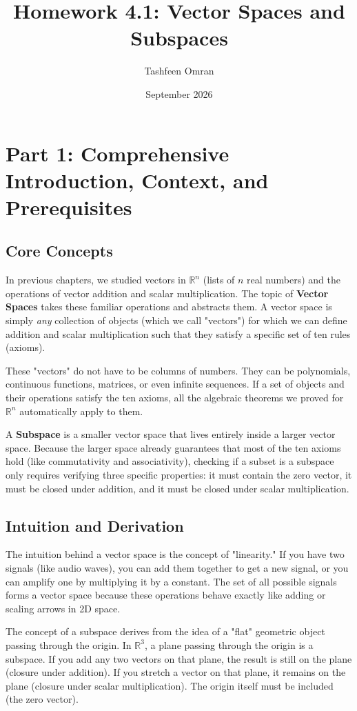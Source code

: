 \documentclass[12pt]{article}
\title{Homework 4.1: Vector Spaces and Subspaces}
\author{Tashfeen Omran}
\date{September 2026}
\begin{document}
\maketitle
\tableofcontents
\newpage

\section{Part 1: Comprehensive Introduction, Context, and Prerequisites}

\subsection{Core Concepts}
In previous chapters, we studied vectors in $\mathbb{R}^n$ (lists of $n$ real numbers) and the operations of vector addition and scalar multiplication. The topic of \textbf{Vector Spaces} takes these familiar operations and abstracts them. A vector space is simply \textit{any} collection of objects (which we call "vectors") for which we can define addition and scalar multiplication such that they satisfy a specific set of ten rules (axioms). 

These "vectors" do not have to be columns of numbers. They can be polynomials, continuous functions, matrices, or even infinite sequences. If a set of objects and their operations satisfy the ten axioms, all the algebraic theorems we proved for $\mathbb{R}^n$ automatically apply to them.

A \textbf{Subspace} is a smaller vector space that lives entirely inside a larger vector space. Because the larger space already guarantees that most of the ten axioms hold (like commutativity and associativity), checking if a subset is a subspace only requires verifying three specific properties: it must contain the zero vector, it must be closed under addition, and it must be closed under scalar multiplication.

\subsection{Intuition and Derivation}
The intuition behind a vector space is the concept of "linearity." If you have two signals (like audio waves), you can add them together to get a new signal, or you can amplify one by multiplying it by a constant. The set of all possible signals forms a vector space because these operations behave exactly like adding or scaling arrows in 2D space. 

The concept of a subspace derives from the idea of a "flat" geometric object passing through the origin. In $\mathbb{R}^3$, a plane passing through the origin is a subspace. If you add any two vectors on that plane, the result is still on the plane (closure under addition). If you stretch a vector on that plane, it remains on the plane (closure under scalar multiplication). The origin itself must be included (the zero vector).
\end{document}
